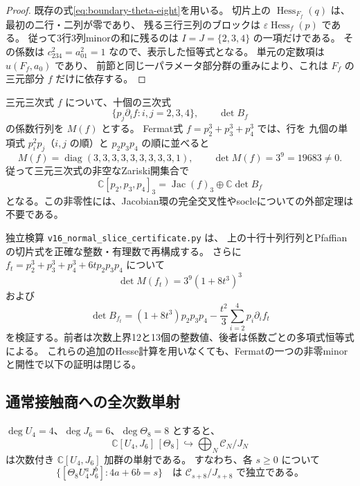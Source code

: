 \begin{proof}
既存の式\eqref{eq:boundary-theta-eight}を用いる。
切片上の $\operatorname{Hess}_{F_f}(q)$ は、最初の二行・二列が零であり、
残る三行三列のブロックは $\varepsilon\operatorname{Hess}_f(p)$ である。
従って3行3列minorの和に残るのは
$I=J=\{2,3,4\}$ の一項だけである。
その係数は $c_{234}^2=a_{01}^2=1$ なので、表示した恒等式となる。
単元の定数項は $u(F_f,a_0)$ であり、
前節と同じ一パラメータ部分群の重みにより、これは $F_f$ の三元部分 $f$ だけに依存する。
\end{proof}

三元三次式 $f$ について、十個の三次式
\begin{equation}\label{eq:v16-ten-ternary-cubics}
 \{p_j\partial_i f: i,j=2,3,4\},\qquad \det B_f
\end{equation}
の係数行列を $M(f)$ とする。
Fermat式 $f=p_2^3+p_3^3+p_4^3$ では、行を
九個の単項式 $p_i^2p_j$（$i,j$ の順）と $p_2p_3p_4$ の順に並べると
\begin{equation}\label{eq:v16-fermat-normal-minor}
 M(f)=\operatorname{diag}(3,3,3,3,3,3,3,3,3,1),
 \qquad\det M(f)=3^9=19683\ne0.
\end{equation}
従って三元三次式の非空なZariski開集合で
\[
 \mathbb C[p_2,p_3,p_4]_3
   =\operatorname{Jac}(f)_3\oplus\mathbb C\det B_f
\]
となる。この非零性には、Jacobian環の完全交叉性やsocleについての外部定理は不要である。

独立検算 \nolinkurl{v16_normal_slice_certificate.py} は、
上の十行十列行列とPfaffianの切片式を正確な整数・有理数で再構成する。
さらに $f_t=p_2^3+p_3^3+p_4^3+6t p_2p_3p_4$ について
\[
 \det M(f_t)=3^9(1+8t^3)^3
\]
および
\[
 \det B_{f_t}
 =(1+8t^3)p_2p_3p_4-\frac{t^2}{3}\sum_{i=2}^4p_i\partial_i f_t
\]
を検証する。前者は次数上界12と13個の整数値、後者は係数ごとの多項式恒等式による。
これらの追加のHesse計算を用いなくても、Fermatの一つの非零minorと開性で以下の証明は閉じる。

\subsection{通常接触商への全次数単射}

\begin{theorem}
\label{thm:v16-hessian-socle-injection}
$\deg U_4=4$、$\deg J_6=6$、$\deg\Theta_8=8$ とすると、
\begin{equation}\label{eq:v16-theta-module-injection}
 \mathbb C[U_4,J_6]\,[\Theta_8]
 \hookrightarrow
 \bigoplus_N\mathcal C_N/J_N
\end{equation}
は次数付き $\mathbb C[U_4,J_6]$ 加群の単射である。
すなわち、各 $s\ge0$ について
\[
 \{[\Theta_8U_4^aJ_6^b]:4a+6b=s\}
 \quad\text{は }\mathcal C_{s+8}/J_{s+8}\text{ で独立である。}
\]
\end{theorem}

